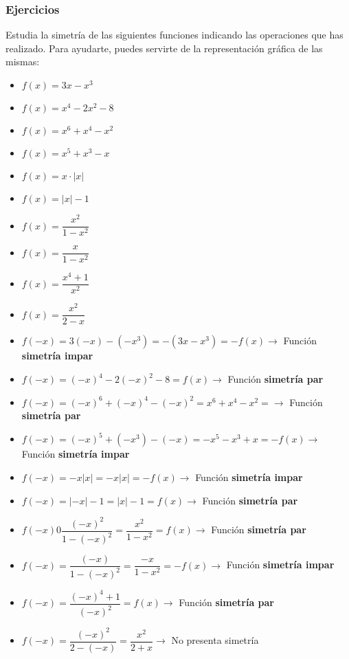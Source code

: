 \subsubsection{Ejercicios}
\begin{ex}
	Estudia la simetría de las siguientes funciones indicando las operaciones que has realizado. Para ayudarte, puedes servirte de la representación gráfica de las mismas:\\
	\begin{itemize}
		\item $f(x) = 3x-x^3$
		\item $f(x) = x^4-2x^2-8$
		\item $f(x) = x^6+x^4-x^2$
		\item $f(x) = x^5+x^3-x$
		\item $f(x) = x \cdot |x|$
		\item $f(x) = |x| - 1$
		\item $f(x) = \dfrac{x^2}{1-x^2}$
		\item $f(x) = \dfrac{x}{1-x^2}$
		\item $f(x) = \dfrac{x^4+1}{x^2}$
		\item $f(x) = \dfrac{x^2}{2-x}$
	\end{itemize}
	\begin{sol}
		\begin{itemize}
			\item $f(-x)=3(-x)-(-x^3)=-(3x-x^3)=-f(x) \rightarrow$ Función \textbf{simetría impar}
			\item $f(-x) = (-x)^4-2(-x)^2-8 = f(x) \rightarrow$ Función \textbf{simetría par}
			\item $f(-x) = (-x)^6+(-x)^4-(-x)^2 = x^6+x^4-x^2 = \rightarrow$ Función \textbf{simetría par}
			\item $f(-x) = (-x)^5+(-x^3)-(-x) = -x^5-x^3+x = -f(x) \rightarrow$ Función \textbf{simetría impar}
			\item $f(-x) = -x |x|= -x|x| = -f(x) \rightarrow$ Función \textbf{simetría impar}
			\item $f(-x) = |-x|-1 = |x|-1 = f(x) \rightarrow$ Función \textbf{simetría par}
			\item $f(-x)0\dfrac{(-x)^2}{1-(-x)^2} = \dfrac{x^2}{1-x^2} = f(x) \rightarrow$ Función \textbf{simetría par}
			\item $f(-x) = \dfrac{(-x)}{1-(-x)^2} = \dfrac{-x}{1-x^2} =-f(x) \rightarrow$ Función \textbf{simetría impar}
			\item $f(-x) = \dfrac{(-x)^4+1}{(-x)^2} = f(x) \rightarrow$ Función \textbf{simetría par}
			\item $f(-x) = \dfrac{(-x)^2}{2-(-x)} = \dfrac{x^2}{2+x} \rightarrow$ No presenta simetría
		\end{itemize}
	\end{sol}
\end{ex}

